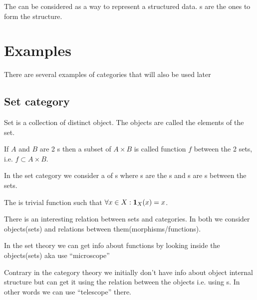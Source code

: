 The  can be considered as a way to represent a
structured data. s are the ones to form the
structure. 


\section{Examples}

There are several examples of categories that will also be used later

\subsection{\textbf{Set} category}

\begin{definition}[Set]
  \label{def:set}
  Set is a collection of distinct object. The objects are called the
  elements of the set.
\end{definition}

\begin{definition}[Function]
  \label{def:function}
  If $A$ and $B$ are 2 s then a subset of $A \times B$ is
  called function $f$ between the 2 sets, i.e. $f \subset A \times B$.
\end{definition}


\begin{example}
  \label{ex:setcategory}
  In the set category we consider a  of
  s where 
  s are the s and
  s are s between the
  sets.

  The  is trivial function such that $\forall x \in
  X: \idarrow[X](x) = x$.
\end{example}

\begin{remark}
  \label{rem:set_vs_category}
  There is an interesting relation between sets and categories. In both
  we consider objects(sets) and relations between
  them(morphisms/functions). 

  In the set theory we can get info about functions by looking inside
  the objects(sets) aka use ``microscope'' \cite{bib:milewski2018category} 

  Contrary in the category theory we initially don't have info about object
  internal structure but can get it using the relation between the
  objects i.e. using s. In other words we can use
  ``telescope'' \cite{bib:milewski2018category}  there.
\end{remark}

